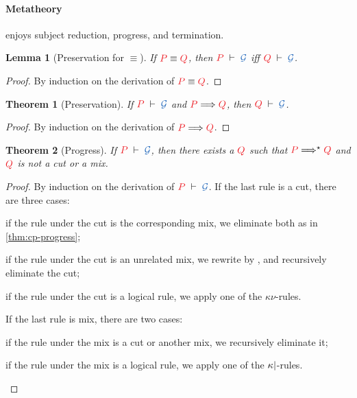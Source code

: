 \documentclass[draft,submission,copyright,creativecommons]{eptcs}
\newtheorem{lemma}{Lemma}
\newtheorem{theorem}{Theorem}
\begin{document}
\paragraph{Metatheory}
\hcp enjoys subject reduction, progress, and termination.
\begin{lemma}[Preservation for $\equiv$]\label{lem:hcp-preservation-equiv}
  If $\tm{P}\equiv\tm{Q}$, then $\seq[P]{\mathcal{G}}$ iff $\seq[Q]{\mathcal{G}}$.
\end{lemma}\vspace*{-0.75\baselineskip}%
\begin{proof}
  By induction on the derivation of $\tm{P}\equiv\tm{Q}$.
\end{proof}\vspace*{-0.75\baselineskip}%
\begin{theorem}[Preservation]\label{thm:hcp-preservation}
  If $\seq[P]{\mathcal{G}}$ and $\reducesto{P}{Q}$, then $\seq[Q]{\mathcal{G}}$.
\end{theorem}\vspace*{-0.75\baselineskip}%
\begin{proof}
  By induction on the derivation of $\reducesto{P}{Q}$.
\end{proof}\vspace*{-0.75\baselineskip}%
\begin{theorem}[Progress]\label{thm:hcp-progress}
  If $\seq[P]{\mathcal{G}}$, then there exists a $\tm{Q}$ such that
  $\tm{P}\Longrightarrow^\star\tm{Q}$ and $\tm{Q}$ is not a cut or a mix.
\end{theorem}\vspace*{-0.75\baselineskip}%
\begin{proof}
  By induction on the derivation of $\seq[P]{\mathcal{G}}$. If the last rule is a cut, there are three cases:
  \begin{enumerate*}[label={\alph*)}]
  \item
    if the rule under the cut is the corresponding mix, we eliminate both as in
    \cref{thm:cp-progress};
  \item
    if the rule under the cut is an unrelated mix, we rewrite by \hccpEquivScopeExt{}, and recursively eliminate the cut;
  \item
    if the rule under the cut is a logical rule, we apply one of the $\kappa\nu$-rules.
  \end{enumerate*}
  If the last rule is mix, there are two cases:
  \begin{enumerate*}[label={\alph*)}]
  \item
    if the rule under the mix is a cut or another mix, we recursively eliminate it;
  \item
    if the rule under the mix is a logical rule, we apply one of the
    $\kappa{\ensuremath{\mid}}$-rules.
  \end{enumerate*}
\end{proof}\vspace*{-0.75\baselineskip}%
\end{document}
